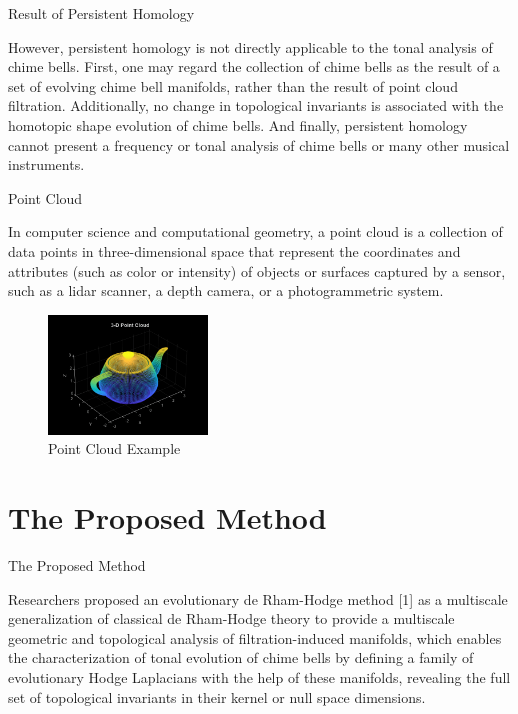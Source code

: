\documentclass[aspectratio=169,xcolor=dvipsnames]{beamer}
\begin{document}
\begin{frame}{Result of Persistent Homology}
\begin{small}
    However, persistent homology is not directly applicable to the tonal analysis of chime bells. First, one may regard the collection of chime bells as the result of a set of evolving chime bell manifolds, rather than the result of point cloud filtration. Additionally, no change in topological invariants is associated with the homotopic shape evolution of chime bells. And finally, persistent homology cannot present a frequency or tonal analysis of chime bells or many other musical instruments.
\end{small}
\end{frame}
\begin{frame}{Point Cloud}
    \begin{small}
        In computer science and computational geometry, a point cloud is a collection of data points in three-dimensional space that represent the coordinates and attributes (such as color or intensity) of objects or surfaces captured by a sensor, such as a lidar scanner, a depth camera, or a photogrammetric system.
    \end{small}
    \begin{figure}[!ht]
\label{pointcloud}
 \centering
 \includegraphics[width=120pt]{images/pointcloud.png}
 \caption{Point Cloud Example}
 \end{figure}
\end{frame}

\section{The Proposed Method}
\begin{frame}{The Proposed Method}
\begin{small}
    Researchers proposed an evolutionary de Rham-Hodge method [1] as a multiscale generalization of classical de Rham-Hodge theory to provide a multiscale geometric and topological analysis of filtration-induced manifolds, which enables the characterization of tonal evolution of chime bells by defining a family of evolutionary Hodge Laplacians with the help of these manifolds, revealing the full set of topological invariants in their kernel or null space dimensions.
\end{small}
\end{frame}
\end{document}
